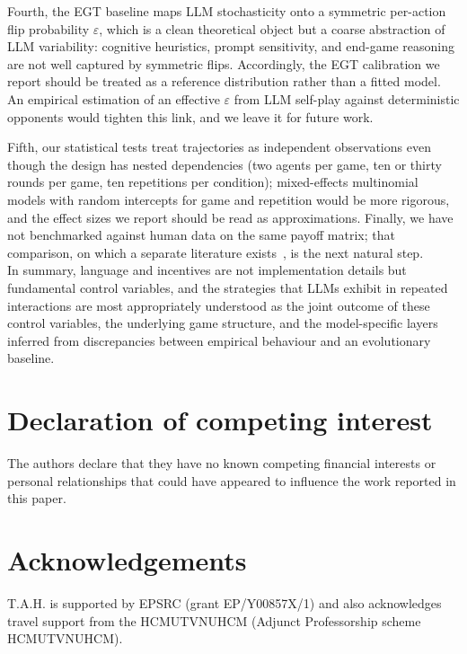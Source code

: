 \documentclass[a4paper,fleqn]{cas-sc}
\begin{document}
Fourth, the EGT baseline maps LLM stochasticity onto a symmetric per-action flip probability $\varepsilon$, which is a clean theoretical object but a coarse abstraction of LLM variability: cognitive heuristics, prompt sensitivity, and end-game reasoning are not well captured by  symmetric flips. Accordingly, the EGT calibration we report should be treated as a reference distribution rather than a fitted model. An empirical estimation of an effective $\varepsilon$ from LLM self-play against deterministic opponents would tighten this link, and we leave it for future work. 

Fifth, our statistical tests treat trajectories as independent observations even though the design has nested dependencies (two agents per game, ten or thirty rounds per game, ten repetitions per condition); mixed-effects multinomial models with random intercepts for game and repetition would be more rigorous, and the effect sizes we report should be read as approximations. Finally, we have not benchmarked against human data on the same payoff matrix; that comparison, on which a separate literature exists~\cite{krockow2016cooperation,list2006friend}, is the next natural step.\\


In summary, language and incentives are not  implementation details but fundamental control variables, and the strategies that LLMs exhibit in repeated interactions are most appropriately understood as the joint outcome of these control variables, the underlying game structure, and the model-specific layers inferred from discrepancies between empirical behaviour and an evolutionary baseline.





\section*{Declaration of competing interest}

The authors declare that they have no known competing financial interests or personal relationships that could have appeared to influence the work reported in this paper.

\section*{Acknowledgements}
T.A.H. is supported by EPSRC (grant EP/Y00857X/1) and also acknowledges travel support from the HCMUT\text{-}VNUHCM (Adjunct Professorship scheme HCMUT\text{-}VNUHCM).




\printcredits





\end{document}
